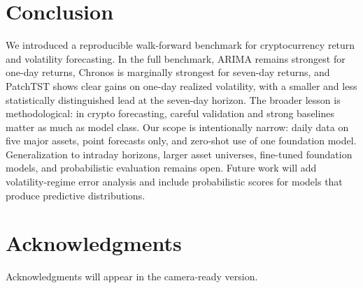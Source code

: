 \documentclass[10pt]{article}
\begin{document}
\section{Conclusion}
We introduced a reproducible walk-forward benchmark for cryptocurrency return
and volatility forecasting. In the full benchmark, ARIMA remains strongest for
one-day returns, Chronos is marginally strongest for seven-day returns, and
PatchTST shows clear gains on one-day realized volatility, with a smaller and
less statistically distinguished lead at the seven-day horizon. The broader
lesson is methodological: in crypto forecasting, careful validation and strong
baselines matter as much as model class. Our scope is intentionally narrow:
daily data on five major assets, point forecasts only, and zero-shot use of one
foundation model. Generalization to intraday horizons, larger asset universes,
fine-tuned foundation models, and probabilistic evaluation remains open. Future
work will add volatility-regime error analysis and include probabilistic scores
for models that produce predictive distributions.

\section*{Acknowledgments}
Acknowledgments will appear in the camera-ready version.

\FloatBarrier


\end{document}
